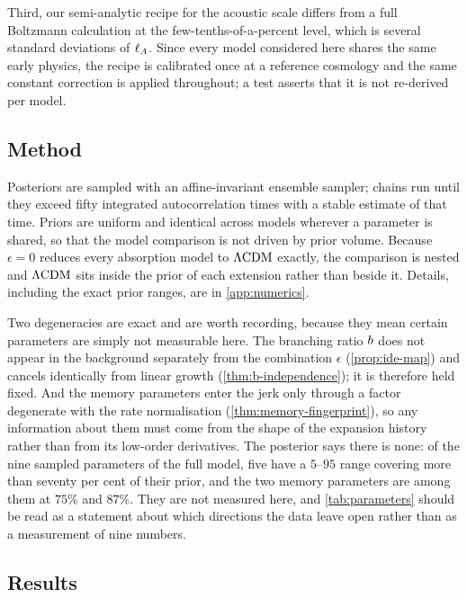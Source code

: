 Third, our semi-analytic recipe for the acoustic scale differs from a full
Boltzmann calculation at the few-tenths-of-a-percent level, which is several
standard deviations of $\ell_{A}$. Since every model considered here shares the same
early physics, the recipe is calibrated once at a reference cosmology and the
same constant correction is applied throughout; a test asserts that it is not
re-derived per model.

\subsection{Method}\label{sec:observations-method}

Posteriors are sampled with an affine-invariant ensemble sampler; chains run
until they exceed fifty integrated autocorrelation times with a stable estimate
of that time. Priors are uniform and identical across models wherever a
parameter is shared, so that the model comparison is not driven by prior
volume. Because $\epsilon=0$ reduces every absorption model to $\Lambda\mathrm{CDM}$ exactly,
the comparison is nested and $\Lambda\mathrm{CDM}$ sits inside the prior of each extension
rather than beside it. Details, including the exact prior ranges, are in
\cref{app:numerics}.

Two degeneracies are exact and are worth recording, because they mean certain
parameters are simply not measurable here. The branching ratio $b$ does
not appear in the background separately from the combination $\epsilon$
(\cref{prop:ide-map}) and cancels identically from linear growth
(\cref{thm:b-independence}); it is therefore held fixed. And the memory
parameters enter the jerk only through a factor degenerate with the rate
normalisation (\cref{thm:memory-fingerprint}), so any information about them
must come from the shape of the expansion history rather than from its
low-order derivatives. The posterior says there is none: of the nine sampled
parameters of the full model, five have a $5$--$95$ range covering more than
seventy per cent of their prior, and the two memory parameters are among them
at $75\%$ and $87\%$. They are not measured here, and \cref{tab:parameters}
should be read as a statement about which directions the data leave open rather
than as a measurement of nine numbers.

\subsection{Results}\label{sec:observations-results}

